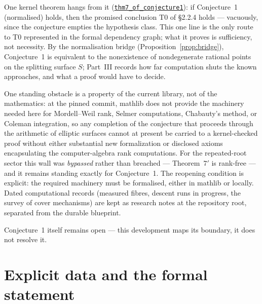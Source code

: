 \documentclass[11pt]{amsart}
\newcommand{\repourl}{https://github.com/hirokifukui/rd-quartics-classification}
\newcommand{\repotag}{v1.1.0}
\newcommand{\leanline}[3]{\href{\repourl/blob/\repotag/#1\#L#2}{\texttt{#3}}}
\begin{document}
\noindent One kernel theorem hangs from it
(\leanline{Gap/BMThm7Transcript.lean}{1002}{thm7\_of\_conjecture1}):
if Conjecture~1 (normalised) holds, then the promised conclusion T0 of
\S2.2.4 holds --- vacuously, since the conjecture empties the
hypothesis class.  This one line is the only route to T0 represented in the formal
dependency graph;
what it proves is sufficiency, not necessity.  By the normalisation
bridge (Proposition~\ref{prop:bridge}), Conjecture~1 is equivalent to
the nonexistence of nondegenerate rational points on the splitting
surface $S$; Part~III records how far computation shuts the known
approaches, and what a proof would have to decide.

One standing obstacle is a property of the current library, not of the
mathematics: at the pinned commit, mathlib does not provide the machinery needed
here for Mordell--Weil rank, Selmer computations, Chabauty's method,
or Coleman integration, so any completion of the conjecture that proceeds
through the arithmetic of elliptic surfaces cannot at present be
carried to a kernel-checked proof without either substantial new
formalization or disclosed axioms encapsulating the computer-algebra
rank computations.  For the repeated-root sector this wall was
\emph{bypassed} rather than breached --- Theorem~$7'$ is rank-free ---
and it remains standing exactly for Conjecture~1.  The reopening
condition is explicit: the required machinery must be formalised,
either in mathlib or locally.
Dated computational records (measured fibres, descent runs in
progress, the survey of cover mechanisms) are kept as research notes at
the repository root, separated from the durable blueprint.

Conjecture~1 itself remains open --- this development maps its
boundary, it does not resolve it.

\appendix

\section{Explicit data and the formal statement}\label{app:data}
\end{document}
